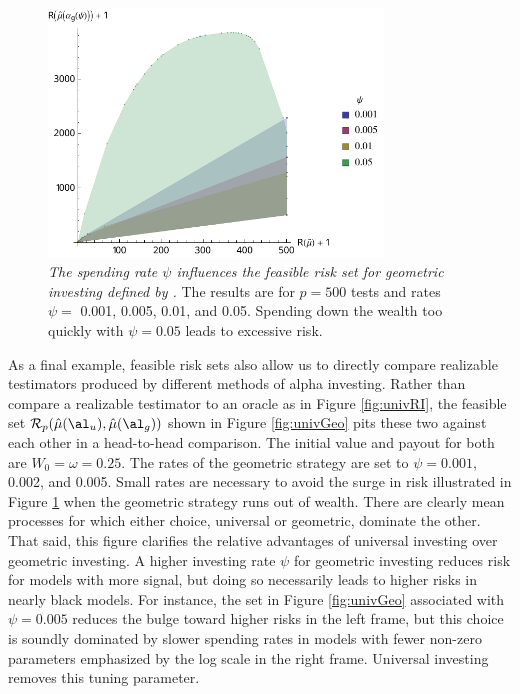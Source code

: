 \documentclass[12pt]{article}
\begin{document}
\begin{figure}
 \caption{ \label{fig:geo} {\sl The spending rate $\psi$ influences the feasible risk set for geometric investing defined by .}  The results are for $p=500$ tests and rates $\psi=$ 0.001, 0.005, 0.01, and 0.05. Spending down the wealth too quickly
 with $\psi=0.05$ leads to excessive risk.  }

 \vspace{0.1in}
 \centerline{
   \includegraphics[width=3.5in]{figures/geom}     }
 \vspace{0.2in}
\end{figure}


 As a final example, feasible risk sets also allow us to directly compare
 realizable testimators produced by different methods of alpha investing.
  Rather than compare a realizable testimator to an oracle
 as in Figure \ref{fig:univRI}, the feasible set ${\cal R}_p (\hat\mu(\al_u),
 \hat\mu(\al_g))$ shown in Figure \ref{fig:univGeo} pits these two against each
 other in a head-to-head comparison.  The initial value and payout for both are
 $W_0 = \omega = 0.25$.  The rates of the geometric strategy are set to
 $\psi=0.001$, 0.002, and 0.005.  Small rates are necessary to avoid the surge
 in risk illustrated in Figure \ref{fig:geo} when the geometric strategy runs
 out of wealth.  There are clearly mean processes for which either choice,
 universal or geometric, dominate the other.  That said, this figure clarifies
 the relative advantages of universal investing over geometric investing.  
 A higher investing rate $\psi$ for geometric investing
 reduces risk for models with more signal, but doing so necessarily leads to
 higher risks in nearly black models.  For instance, the set in Figure
 \ref{fig:univGeo} associated with $\psi = 0.005$ reduces the bulge toward higher
 risks in the left frame, but this choice is soundly dominated by slower
 spending rates in models with fewer non-zero parameters emphasized by the log scale in the right frame.  Universal investing removes this tuning parameter.
\end{document}

